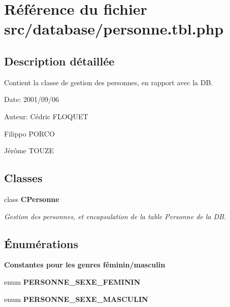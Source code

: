 \section{Référence du fichier src/database/personne.tbl.php}
\label{personne_8tbl_8php}


\subsection{Description détaillée}
Contient la classe de gestion des personnes, en rapport avec la DB. 

\begin{Desc}
\item[Date:]2001/09/06\end{Desc}
\begin{Desc}
\item[Auteur:]Cédric FLOQUET 

Filippo PORCO 

Jérôme TOUZE \end{Desc}


\subsection*{Classes}
\begin{CompactItemize}
\item 
class {\bf CPersonne}
\begin{CompactList}\small\item\em Gestion des personnes, et encapsulation de la table Personne de la DB. \item\end{CompactList}\end{CompactItemize}
\subsection*{Énumérations}
\begin{Indent}{\bf Constantes pour les genres féminin/masculin}\par
\begin{CompactItemize}
\item 
enum \textbf{PERSONNE\_\-SEXE\_\-FEMININ} 
\item 
enum \textbf{PERSONNE\_\-SEXE\_\-MASCULIN} 
\end{CompactItemize}
\end{Indent}
